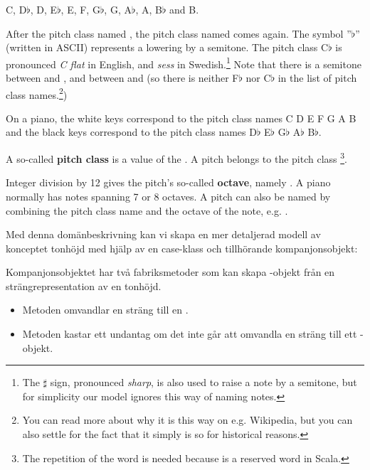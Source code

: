 C, D$\flat$, D, E$\flat$, E, F, G$\flat$, G, A$\flat$, A, B$\flat$ and B.

After the pitch class named , the pitch class named  comes again.
The symbol ''$\flat$'' (written  in ASCII) represents a lowering by a semitone. The pitch class C$\flat$ is pronounced \emph{C flat} in English, and \emph{sess} in Swedish.\footnote{The $\sharp$ sign, pronounced \emph{sharp}, is also used to raise a note by a semitone, but for simplicity our model ignores this way of naming notes.}
Note that there is a semitone between  and , and between  and  (so there is neither F$\flat$ nor C$\flat$ in the list of pitch class names.\footnote{You can read more about why it is this way on e.g. Wikipedia, but you can also settle for the fact that it simply is so for historical reasons.})

On a piano, the white keys correspond to the pitch class names C D E F G A B and the black keys correspond to the pitch class names D$\flat$ E$\flat$ G$\flat$ A$\flat$ B$\flat$.

A so-called \textbf{pitch class} is a value of the  .
A pitch  belongs to the pitch class \footnote{The repetition of the word  is needed because  is a reserved word in Scala.}.

Integer division by 12 gives the pitch's so-called \textbf{octave}, namely . A piano normally has notes spanning 7 or 8 octaves.
A pitch can also be named by combining the pitch class name and the octave of the note, e.g. .
\fi

Med denna domänbeskrivning kan vi skapa en mer detaljerad modell av konceptet tonhöjd med hjälp av en case-klass och tillhörande kompanjonsobjekt:


\noindent Kompanjonsobjektet har två fabriksmetoder som kan skapa -objekt från en strängrepresentation av en tonhöjd.

\begin{itemize}[noitemsep]
  \item Metoden  omvandlar en sträng till en .

  \item Metoden  kastar ett undantag om det inte går att omvandla en sträng till ett -objekt.
\end{itemize}

